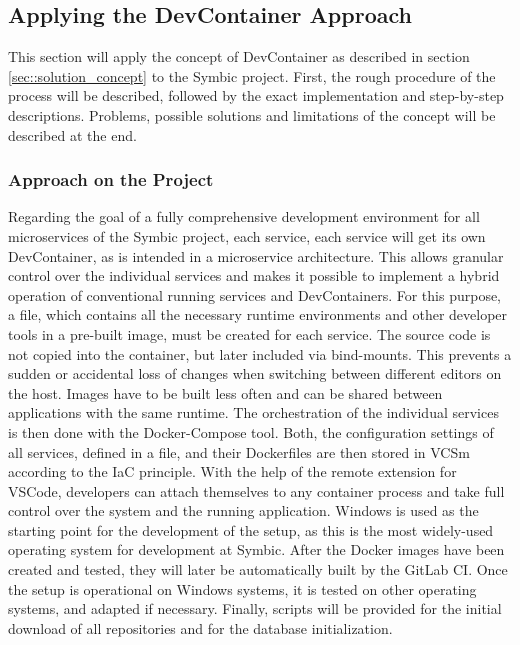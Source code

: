     \subsection{Applying the DevContainer Approach}\label{ssec::apply}
    This section will apply the concept of DevContainer as described in section \ref{sec::solution_concept} to the Symbic project. First, the rough procedure of the process will be described, followed by the exact implementation and step-by-step descriptions. Problems, possible solutions and limitations of the concept will be described at the end.

        \subsubsection{Approach on the Project}\label{ssec::imp_approach}
        Regarding the goal of a fully comprehensive development environment for all microservices of the Symbic project, each service, each service will get its own DevContainer, as is intended in a microservice architecture. This allows granular control over the individual services and makes it possible to implement a hybrid operation of conventional running services and DevContainers. For this purpose, a  file, which contains all the necessary runtime environments and other developer tools in a pre-built image, must be created for each service. The source code is not copied into the container, but later included via bind-mounts. This prevents a sudden or accidental loss of changes when switching between different editors on the host. Images have to be built less often and can be shared between applications with the same runtime. The orchestration of the individual services is then done with the Docker-Compose tool. Both, the configuration settings of all services, defined in a  file, and their Dockerfiles are then stored in \ac{VCS}m according to the \ac{IaC} principle. With the help of the remote extension for \ac{VSCode}, developers can attach themselves to any container process and take full control over the system and the running application.\newline
        Windows is used as the starting point for the development of the setup, as this is the most widely-used operating system for development at Symbic. After the Docker images have been created and tested, they will later be automatically built by the GitLab \ac{CI}. Once the setup is operational on Windows systems, it is tested on other operating systems, and adapted if necessary. Finally, scripts will be provided for the initial download of all repositories and for the database initialization.

